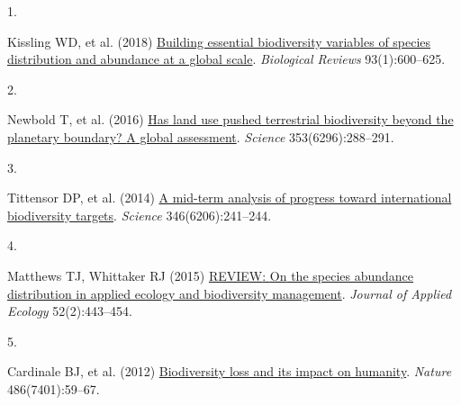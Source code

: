 \documentclass[9pt,twocolumn,twoside,]{pnas-new}
\newlength{\cslhangindent}
\newlength{\csllabelwidth}
\newenvironment{CSLReferences}[2] %
 {\begin{list}{}{%
  \setlength{\itemindent}{0pt}
  \setlength{\leftmargin}{0pt}
  \setlength{\parsep}{0pt}
  \ifodd #1
   \setlength{\leftmargin}{\cslhangindent}
   \setlength{\itemindent}{-1\cslhangindent}
  \fi
  \setlength{\itemsep}{#2\baselineskip}}}
 {\end{list}}
\newcommand{\CSLLeftMargin}[1]{\parbox[t]{\csllabelwidth}{#1}}
\newcommand{\CSLRightInline}[1]{\parbox[t]{\linewidth - \csllabelwidth}{#1}\break}
\begin{document}
\label{refs}
\begin{CSLReferences}{0}{1}
\CSLLeftMargin{1. }%
\CSLRightInline{Kissling WD, et al. (2018)
\href{https://doi.org/10.1111/brv.12359}{Building essential biodiversity
variables of species distribution and abundance at a global scale}.
\emph{Biological Reviews} 93(1):600--625.}

\CSLLeftMargin{2. }%
\CSLRightInline{Newbold T, et al. (2016)
\href{https://doi.org/10.1126/science.aaf2201}{Has land use pushed
terrestrial biodiversity beyond the planetary boundary? {A} global
assessment}. \emph{Science} 353(6296):288--291.}

\CSLLeftMargin{3. }%
\CSLRightInline{Tittensor DP, et al. (2014)
\href{https://doi.org/10.1126/science.1257484}{A mid-term analysis of
progress toward international biodiversity targets}. \emph{Science}
346(6206):241--244.}

\CSLLeftMargin{4. }%
\CSLRightInline{Matthews TJ, Whittaker RJ (2015)
\href{https://doi.org/10.1111/1365-2664.12380}{{REVIEW}: {On} the
species abundance distribution in applied ecology and biodiversity
management}. \emph{Journal of Applied Ecology} 52(2):443--454.}

\CSLLeftMargin{5. }%
\CSLRightInline{Cardinale BJ, et al. (2012)
\href{https://doi.org/10.1038/nature11148}{Biodiversity loss and its
impact on humanity}. \emph{Nature} 486(7401):59--67.}

\end{CSLReferences}



% 
\end{document}
